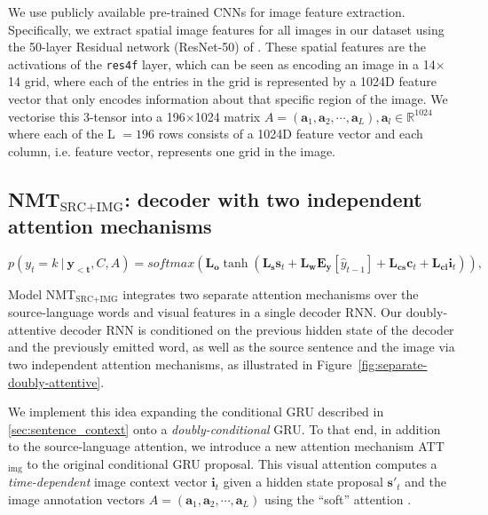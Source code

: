 \documentclass[11pt]{article}
\newcommand\given[1][]{\:#1\vert\:}
\begin{document}
We use publicly available pre-trained CNNs for image feature extraction.
Specifically, we extract spatial image features for all images in our dataset using the 50-layer Residual network (ResNet-50) of .
These spatial features are the activations of the \texttt{res4f} layer, which can be seen as encoding an image in a 14$\times$14 grid, where each of the entries in the grid is represented by a 1024D feature vector that only encodes information about that specific region of the image.
We vectorise this 3-tensor into a 196$\times$1024 matrix $A = (\bm{a}_1, \bm{a}_2, \cdots, \bm{a}_L), \bm{a}_l \in \mathbb{R}^{1024}$ where each of the L $=196$ rows consists of a 1024D feature vector and each column, i.e. feature vector, represents one grid in the image.



\subsection{\texorpdfstring{NMT$_{\text{SRC+IMG}}$}{}: decoder with two independent attention mechanisms}
\label{sec:model_2}


\begin{figure*}[ht!]\vspace{-10px}
\begin{equation}\label{eq:logit_imgrnn}
  p(y_t = k \given \bm{y_{<t}}, C, A) =
    softmax(\bm{L_o} \tanh(
    \bm{L_{s}} \bm{s}_t +
    \bm{L_w} \bm{E_y}[\hat{y}_{t-1}] +
    \bm{L_{cs}} \bm{c}_t +
    \bm{L_{ci}} \bm{i}_t)),
\end{equation}
\end{figure*}


Model NMT$_{\text{SRC+IMG}}$ integrates two separate attention mechanisms over the source-language words and visual features in a single decoder RNN.
Our doubly-attentive decoder RNN is conditioned on the previous hidden state of the decoder and the previously emitted word, as well as the source sentence and the image via two independent attention mechanisms, as illustrated in Figure~\ref{fig:separate-doubly-attentive}.

We implement this idea expanding the conditional GRU described in \cref{sec:sentence_context} onto a \emph{doubly-conditional} GRU.
To that end, in addition to the source-language attention, we introduce a new attention mechanism ATT$_\text{img}$ to the original conditional GRU proposal.
This visual attention computes a \emph{time-dependent} image context vector $\bm{i}_t$ given a hidden state proposal $\bm{s}'_t$ and the image annotation vectors $A = (\bm{a}_1, \bm{a}_2, \cdots, \bm{a}_L)$ using the ``soft'' attention \cite{Xuetal2015}.
\end{document}

